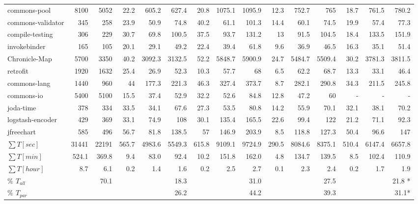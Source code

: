 \begin{landscape}
\begin{table*}[htbp]
{\begin{tabular}{|l|r|r|r|r|r|r|r|r|r|r|r|r|r|r|}
commons-pool	& 8100& 	5052& 	22.2& 	605.2& 	627.4& 	20.8& 	1075.1& 	1095.9& 	12.3& 	752.7& 	765& 	18.7& 	761.5& 	780.2\\
commons-validator	& 345& 	258& 	23.9& 	50.9	& 74.8& 	40.2	& 61.1& 	101.3	& 14.4	& 60.1	& 74.5	& 19.9	& 57.4	& 77.3\\
compile-testing	& 306	& 229& 	30.7	& 69.8	& 100.5	& 37.5	& 93.7	& 131.2	& 13	& 91.5	& 104.5	& 18.4	& 133.5	& 151.9 \\
invokebinder	& 165	& 105	& 20.1	& 29.1	& 49.2	& 22.4	& 39.4	& 61.8	& 9.6	& 36.9	& 46.5	& 16.3	& 35.1	& 51.4\\
Chronicle-Map& 	5700	& 3350	& 40.2	& 3092.3	& 3132.5	& 52.2	& 5848.7	& 5900.9	& 24.7	& 5484.7	& 5509.4	& 30.2	& 3781.3	& 3811.5 \\
retrofit	& 1920& 	1632	& 25.4	& 26.9	& 52.3	& 10.3	& 57.7	& 68	& 6.5	& 62.2	& 68.7	& 13.3	& 33.1	& 46.4 \\
commons-lang	& 1440	& 960	& 44	& 177.3	& 221.3	& 46.3	& 327.4	& 373.7	& 8.7	& 282.1	& 290.8	& 34.3	& 211.5	& 245.8\\
commons-io	& 5400	& 5100	& 15.5	& 37.4	& 52.9	& 32.2	& 52.6	& 84.8	& 12.8	& 47.2	& 60	& - & -	& - \\
joda-time	& 378	& 334	& 33.5	& 34.1	& 67.6	& 27.3	& 53.5	& 80.8	& 14.2	& 55.9	& 70.1& 	32.1	& 38.1	& 70.2 \\
logstash-encoder	& 429	& 369	& 33.1	& 74.9	& 108	& 30.1	& 135.4	& 165.5	& 22.6	& 99.4	& 122	& 21.2	& 71.1	& 92.3 \\
jfreechart	& 585	& 496	& 56.7& 	81.8	& 138.5	& 57	& 146.9	& 203.9	& 8.5	& 118.8	& 127.3	& 50.4	& 96.6	& 147 \\

    \hline
    
$\sum T[sec]$ & 31441 &	22191 &	565.7 &	4983.6 &	5549.3&	615.8 &	9109.1&	9724.9&	290.5 &	8084.6&	8375.1&	510.4&	6147.4&	6657.8 \\
    \hline

$\sum T[min]$ & 524.1 &	369.8 &	9.4 &	83.0 &	92.4 &	10.2 &	151.8 &	162.0 &	4.8 &	134.7 &	139.5 &	8.5 &	102.4 &	110.9 \\
    \hline
$\sum T[hour]$  & 8.7 & 6.1 &	0.2 &	1.4 &	1.6 &	0.2 &	2.5 &	2.7 &	0.1 &	2.3 &	2.4 &	0.2 &	1.7 &	1.9 \\

    \hline
     \textbf{$\%$ $T_{all}$}&  & 70.1  &  &  & 18.3 & &  & 31.0  &  & & 27.5   & &  & 21.8 *\\
     \hline
    \textbf{$\%$ $T_{par}$}&  &   &  &  & 26.2 & &  & 44.2  &  & & 39.3 &  &  & 31.1*  \\
     \hline
    \end{tabular}%
    }
  \label{table:rq2}%
  \vspace{-1ex}
\end{table*}

\end{landscape}


